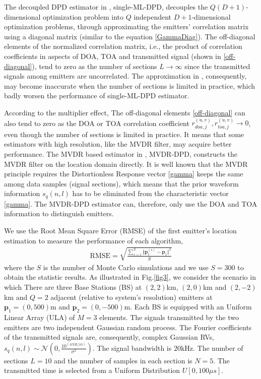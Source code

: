 \documentclass[review]{elsarticle}
\begin{document}
The decoupled DPD estimator in \cite{DPD2005}, single-ML-DPD, decouples the $Q(D+1)$-dimensional optimization problem into $Q$ independent $D+1$-dimensional optimization problems, through approximating the emitters' correlation matrix  using a diagonal matrix (similar to the equation \eqref{GammaDiag}). The off-diagonal elements of the normalized correlation matrix, i.e., the product of correlation coefficients in aspects of DOA, TOA and transmitted signal (shown in \eqref{off-diagonal}), tend to zero as the number of sections $L\to \infty$ since the transmitted signals among emitters are uncorrelated. The approximation in \cite{DPD2005}, consequently, may become inaccurate when the number of sections is limited in practice, which badly worsen the performance of single-ML-DPD estimator. 

According to the multiplier effect, The off-diagonal elements \eqref{off-diagonal} can also tend to zero as the DOA or TOA correlation coefficient $r_{doa,j}^{(u,v)}, r_{toa,j}^{(u,v)}\to 0$, even though the number of sections is limited in practice. It means that some estimators with high resolution, like the MVDR filter, may acquire better performance. The MVDR based estimator in \cite{Tirer2015High}, MVDR-DPD, constructs the MVDR filter on the location domain directly. It is well known that the MVDR principle requires the Distortionless Response vector \eqref{gamma} keeps the same among data samples (signal sections), which means that the prior waveform information $s_q(n,l)$ has to be eliminated from the characteristic vector \eqref{gamma}. The MVDR-DPD estimator can, therefore, only use the DOA and TOA information to distinguish emitters. 

We use the Root Mean Square Error (RMSE) of the first emitter's location estimation to measure the performance of each algorithm,
\begin{align}
    \text{RMSE}=\sqrt{\frac{\sum_{s=1}^S \Vert \boldsymbol{p}_1^{(s)}-\boldsymbol{p}_1\Vert ^2}{S}}
\end{align}
where the $S$ is the number of Monte Carlo simulations and we use $S=300$ to obtain the statistic results. 
As illustrated in Fig.\ref{fig3}, we consider the scenario in which There are three Base Stations (BS) at $(2,2)$km, $(2,0)$km and $(2,-2)$km and $Q=2$ adjacent (relative to system's resolution) emitters at $\boldsymbol{p}_1=(0,500)$m and $\boldsymbol{p}_2=(0,-500)$m. Each BS is equipped with an Uniform Linear Array (ULA) of $M=3$ elements. The signals transmitted by the two emitters are two independent Gaussian random process. The Fourier coefficients of the transmitted signals are, consequently, complex Gaussian RVs, $s_q(n,l)\sim \mathcal{N}(0,\frac{10^{(SNR/10)}}{\sigma^2})$. The signal bandwidth is $20$kHz. The number of sections $L=10$ and the number of samples in each section is $N=5$. The transmitted time is selected from a Uniform Distribution $U[0,100\mu s]$.
\end{document}
